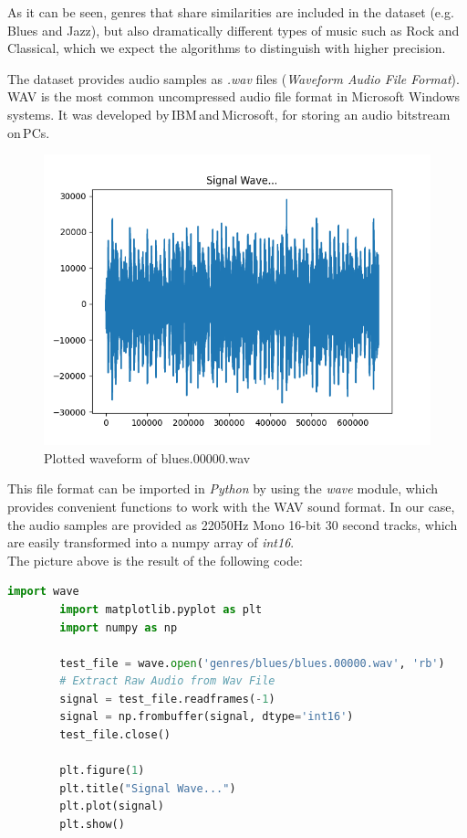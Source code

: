 \documentclass[12pt]{article}
\begin{document}
	As it can be seen, genres that share similarities are included in the dataset (e.g. Blues and Jazz), but also dramatically different types of music such as Rock and Classical, which we expect the algorithms to distinguish with higher precision.
	
	The dataset provides audio samples as \textit{.wav} files (\textit{Waveform Audio File Format}). WAV is the most common uncompressed audio file format in Microsoft Windows systems. It was developed by IBM and Microsoft, for storing an audio bitstream on PCs\cite{wave}.\\
	
	\begin{figure}[H]
		\hspace{100pt}\includegraphics[scale=0.7]{waveform}
		\caption{Plotted waveform of blues.00000.wav}
	\end{figure}
	
	
	This file format can be imported in \textit{Python} by using the \textit{wave} module, which provides convenient functions to work with the WAV sound format. In our case, the audio samples are provided as 22050Hz Mono 16-bit 30 second tracks\cite{marsyas}, which are easily transformed into a numpy array of \textit{int16}.\\
	The picture above is the result of the following code:
	\begin{lstlisting}[language=Python]
		import wave
		import matplotlib.pyplot as plt
		import numpy as np
		
		test_file = wave.open('genres/blues/blues.00000.wav', 'rb')
		# Extract Raw Audio from Wav File
		signal = test_file.readframes(-1)
		signal = np.frombuffer(signal, dtype='int16')
		test_file.close()
		
		plt.figure(1)
		plt.title("Signal Wave...")
		plt.plot(signal)
		plt.show()
		
	\end{lstlisting}
	\newpage
	
\end{document}
